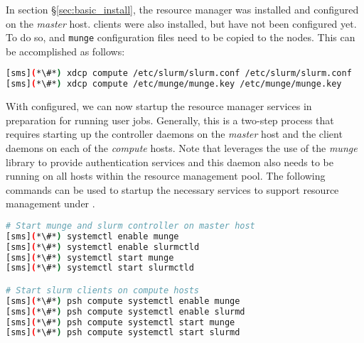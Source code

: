 In section \S\ref{sec:basic_install}, the \SLURM{} resource manager was
installed and configured on the  {\em master} host. \SLURM{} clients were also
installed, but have not been configured yet. To do so, \SLURM{} and
\texttt{munge} configuration files need to be copied to the nodes. This can be
accomplished as follows:

\begin{lstlisting}[language=bash,keywords={}]
[sms](*\#*) xdcp compute /etc/slurm/slurm.conf /etc/slurm/slurm.conf
[sms](*\#*) xdcp compute /etc/munge/munge.key /etc/munge/munge.key
\end{lstlisting}


With \SLURM{} configured, we can now startup the
resource manager services in preparation for running user jobs. Generally, this
is a two-step process that requires starting up the controller daemons on the {\em
 master} host and the client daemons on each of the {\em compute} hosts.
Note that \SLURM{} leverages the use of the {\em munge} library to provide
authentication services and this daemon also needs to be running on all hosts
within the resource management pool. 
The following commands can be used to startup the necessary services to support
resource management under \SLURM{}.


\begin{lstlisting}[language=bash,keywords={}]
# Start munge and slurm controller on master host
[sms](*\#*) systemctl enable munge
[sms](*\#*) systemctl enable slurmctld
[sms](*\#*) systemctl start munge
[sms](*\#*) systemctl start slurmctld

# Start slurm clients on compute hosts
[sms](*\#*) psh compute systemctl enable munge
[sms](*\#*) psh compute systemctl enable slurmd
[sms](*\#*) psh compute systemctl start munge
[sms](*\#*) psh compute systemctl start slurmd
\end{lstlisting}


